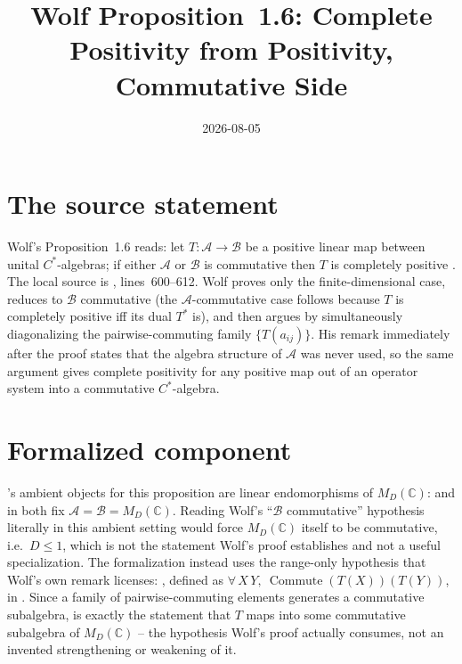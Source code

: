 \documentclass{article}
\title{Wolf Proposition~1.6: Complete Positivity from Positivity, Commutative Side}
\author{}
\date{2026-08-05}
\begin{document}
\maketitle
{}

\section{The source statement}

Wolf's Proposition~1.6 reads: let $T:\mathcal A\to\mathcal B$ be a positive
linear map between unital $C^*$-algebras; if either $\mathcal A$ or
$\mathcal B$ is commutative then $T$ is completely positive
\cite[Proposition~1.6]{Wolf2012Quantum}. The local source is
,
lines~600--612. Wolf proves only the finite-dimensional case, reduces to
$\mathcal B$ commutative (the $\mathcal A$-commutative case follows because
$T$ is completely positive iff its dual $T^*$ is), and then argues by
simultaneously diagonalizing the pairwise-commuting family
$\{T(a_{ij})\}$. His remark immediately after the proof states that the
algebra structure of $\mathcal A$ was never used, so the same argument gives
complete positivity for any positive map out of an operator system into a
commutative $C^*$-algebra.

\section{Formalized component}

\Lean's ambient objects for this proposition are linear endomorphisms of
$M_D(\mathbb C)$:  and  in
 both fix $\mathcal A=\mathcal B=M_D(\mathbb
C)$. Reading Wolf's ``$\mathcal B$ commutative'' hypothesis literally in this
ambient setting would force $M_D(\mathbb C)$ itself to be commutative, i.e.\
$D\le 1$, which is not the statement Wolf's proof establishes and not a
useful specialization. The formalization instead uses the range-only
hypothesis that Wolf's own remark licenses:
, defined as
$\forall\,X\,Y,\ \operatorname{Commute}(T(X))(T(Y))$, in
.
Since a family of pairwise-commuting elements generates a commutative
subalgebra, \leanid{HasCommutingRange T} is exactly the statement that $T$
maps into some commutative subalgebra of $M_D(\mathbb C)$ -- the hypothesis
Wolf's proof actually consumes, not an invented strengthening or weakening
of it.
\end{document}
